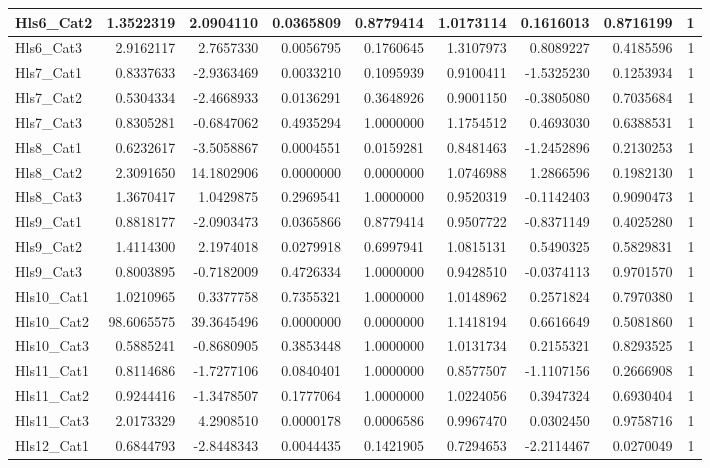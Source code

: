 \documentclass[
]{book}
\begin{document}
\begin{tabular}{l|r|r|r|r|r|r|r|r}
\hline
Hls6\_Cat2 & 1.3522319 & 2.0904110 & 0.0365809 & 0.8779414 & 1.0173114 & 0.1616013 & 0.8716199 & 1\\
\hline
Hls6\_Cat3 & 2.9162117 & 2.7657330 & 0.0056795 & 0.1760645 & 1.3107973 & 0.8089227 & 0.4185596 & 1\\
\hline
Hls7\_Cat1 & 0.8337633 & -2.9363469 & 0.0033210 & 0.1095939 & 0.9100411 & -1.5325230 & 0.1253934 & 1\\
\hline
Hls7\_Cat2 & 0.5304334 & -2.4668933 & 0.0136291 & 0.3648926 & 0.9001150 & -0.3805080 & 0.7035684 & 1\\
\hline
Hls7\_Cat3 & 0.8305281 & -0.6847062 & 0.4935294 & 1.0000000 & 1.1754512 & 0.4693030 & 0.6388531 & 1\\
\hline
Hls8\_Cat1 & 0.6232617 & -3.5058867 & 0.0004551 & 0.0159281 & 0.8481463 & -1.2452896 & 0.2130253 & 1\\
\hline
Hls8\_Cat2 & 2.3091650 & 14.1802906 & 0.0000000 & 0.0000000 & 1.0746988 & 1.2866596 & 0.1982130 & 1\\
\hline
Hls8\_Cat3 & 1.3670417 & 1.0429875 & 0.2969541 & 1.0000000 & 0.9520319 & -0.1142403 & 0.9090473 & 1\\
\hline
Hls9\_Cat1 & 0.8818177 & -2.0903473 & 0.0365866 & 0.8779414 & 0.9507722 & -0.8371149 & 0.4025280 & 1\\
\hline
Hls9\_Cat2 & 1.4114300 & 2.1974018 & 0.0279918 & 0.6997941 & 1.0815131 & 0.5490325 & 0.5829831 & 1\\
\hline
Hls9\_Cat3 & 0.8003895 & -0.7182009 & 0.4726334 & 1.0000000 & 0.9428510 & -0.0374113 & 0.9701570 & 1\\
\hline
Hls10\_Cat1 & 1.0210965 & 0.3377758 & 0.7355321 & 1.0000000 & 1.0148962 & 0.2571824 & 0.7970380 & 1\\
\hline
Hls10\_Cat2 & 98.6065575 & 39.3645496 & 0.0000000 & 0.0000000 & 1.1418194 & 0.6616649 & 0.5081860 & 1\\
\hline
Hls10\_Cat3 & 0.5885241 & -0.8680905 & 0.3853448 & 1.0000000 & 1.0131734 & 0.2155321 & 0.8293525 & 1\\
\hline
Hls11\_Cat1 & 0.8114686 & -1.7277106 & 0.0840401 & 1.0000000 & 0.8577507 & -1.1107156 & 0.2666908 & 1\\
\hline
Hls11\_Cat2 & 0.9244416 & -1.3478507 & 0.1777064 & 1.0000000 & 1.0224056 & 0.3947324 & 0.6930404 & 1\\
\hline
Hls11\_Cat3 & 2.0173329 & 4.2908510 & 0.0000178 & 0.0006586 & 0.9967470 & 0.0302450 & 0.9758716 & 1\\
\hline
Hls12\_Cat1 & 0.6844793 & -2.8448343 & 0.0044435 & 0.1421905 & 0.7294653 & -2.2114467 & 0.0270049 & 1\\

\end{tabular}
\end{document}

